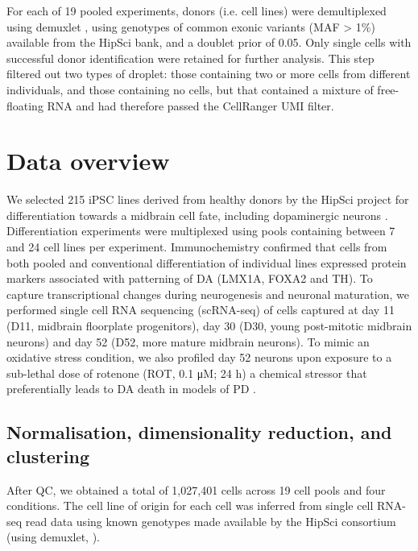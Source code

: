 For each of 19 pooled experiments, donors (i.e. cell lines) were demultiplexed using demuxlet \cite{kang2018multiplexed}, using genotypes of common exonic variants (MAF > 1\%) available from the HipSci bank, and a doublet prior of 0.05. 
Only single cells with successful donor identification were retained for further analysis. 
This step filtered out two types of droplet: those containing two or more cells from different individuals, and those containing no cells, but that contained a mixture of free-floating RNA and had therefore passed the CellRanger UMI filter.

\section{Data overview}

We selected 215 iPSC lines derived from healthy donors by the HipSci project \cite{kilpinen2017common} for differentiation towards a midbrain cell fate, including dopaminergic neurons \cite{kriks2011dopamine}. 
Differentiation experiments were multiplexed using pools containing between 7 and 24 cell lines per experiment. 
Immunochemistry confirmed that cells from both pooled and conventional differentiation of individual lines expressed protein markers associated with patterning of DA (LMX1A, FOXA2 and TH). 
To capture transcriptional changes during neurogenesis and neuronal maturation, we performed single cell RNA sequencing (scRNA-seq) of cells captured at day 11 (D11, midbrain floorplate progenitors), day 30 (D30, young post-mitotic midbrain neurons) and day 52 (D52, more mature midbrain neurons). 
To mimic an oxidative stress condition, we also profiled day 52 neurons upon exposure to a sub-lethal dose of rotenone (ROT, 0.1 μM; 24 h) a chemical stressor that preferentially leads to DA death in models of PD \cite{xiong2012mitochondrial}.

\subsection{Normalisation, dimensionality reduction, and clustering}

After QC, we obtained a total of 1,027,401 cells across 19 cell pools \cite{blondel2008fast} and four conditions. 
The cell line of origin for each cell was inferred from single cell RNA-seq read data using known genotypes made available by the HipSci consortium (using demuxlet, \cite{kang2018multiplexed}). 

